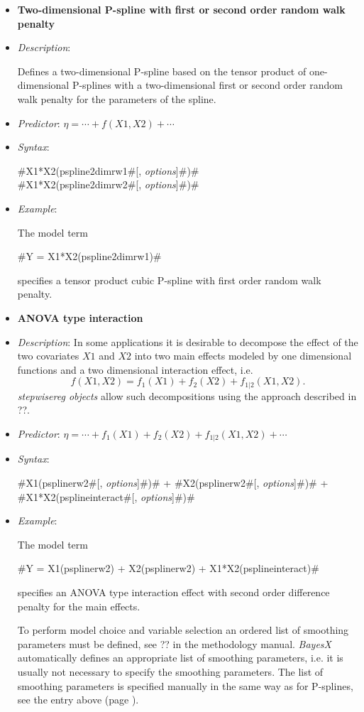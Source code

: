 \begin{itemize}
\item[]{\bf\sffamily Two-dimensional P-spline with first or second order
random walk penalty}

\item[] {\em Description}:

Defines a two-dimensional P-spline based on the tensor product of
one-dimensional P-splines with a two-dimensional first or second order
random walk penalty for the parameters of the spline.
\item[] {\em
Predictor}: $\eta= \cdots + f(X1,X2) + \cdots$ \item[] {\em
Syntax}:

#X1*X2(pspline2dimrw1#[, {\em options}]#)# \\
#X1*X2(pspline2dimrw2#[, {\em options}]#)#
\item[] {\em Example}:

The model term

#Y = X1*X2(pspline2dimrw1)#

specifies a tensor product cubic P-spline with first order random
walk penalty.
\item[]{\bf\sffamily ANOVA type interaction}

\item[] {\em Description}:
In some applications it is desirable to decompose the effect of the two covariates
$X1$ and $X2$ into two main effects modeled by one dimensional functions and a two dimensional interaction effect, i.e.
\begin{equation}
\label{gampspline_2dimtermmain}
f \left(X1,X2\right) = f_1\left(X1 \right) +
f_2 \left(X2\right) + f_{1|2}\left(X1,X2 \right).
\end{equation}
{\em stepwisereg objects} allow such decompositions using the approach described in ??.
\item[] {\em
Predictor}: $\eta= \cdots + f_1(X1) + f_2(X2) + f_{1 | 2}(X1,X2) +  \cdots$
\item[] {\em Syntax}:

#X1(psplinerw2#[, {\em options}]#)# + #X2(psplinerw2#[, {\em options}]#)# + \\
#X1*X2(psplineinteract#[, {\em options}]#)#

\item[] {\em Example}:

The model term

#Y = X1(psplinerw2) + X2(psplinerw2) + X1*X2(psplineinteract)#

specifies an ANOVA type interaction effect with  second order difference penalty for the main effects.

To perform model choice and variable selection an ordered list of smoothing parameters must be defined, see ??
in the methodology manual. {\em BayesX} automatically defines an appropriate list of smoothing parameters, i.e. it
is usually not necessary to  specify the smoothing parameters.
The list of smoothing parameters is specified manually in the same way as for P-splines,
see the entry above (page \pageref{psplines_stepwise}).
\end{itemize}


